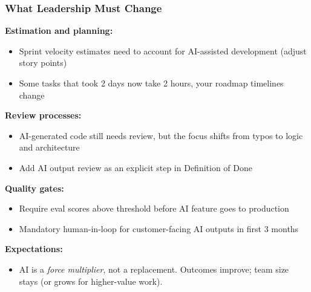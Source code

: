 \begin{frame}[fragile]\frametitle{What Leadership Must Change}
\textbf{Estimation and planning:}
\begin{itemize}
\item Sprint velocity estimates need to account for AI-assisted development (adjust story points)
\item Some tasks that took 2 days now take 2 hours, your roadmap timelines change
\end{itemize}

\textbf{Review processes:}
\begin{itemize}
\item AI-generated code still needs review, but the focus shifts from typos to logic and architecture
\item Add AI output review as an explicit step in Definition of Done
\end{itemize}

\textbf{Quality gates:}
\begin{itemize}
\item Require eval scores above threshold before AI feature goes to production
\item Mandatory human-in-loop for customer-facing AI outputs in first 3 months
\end{itemize}

\textbf{Expectations:}
\begin{itemize}
\item AI is a \textit{force multiplier}, not a replacement. Outcomes improve; team size stays (or grows for higher-value work).
\end{itemize}
\end{frame}


